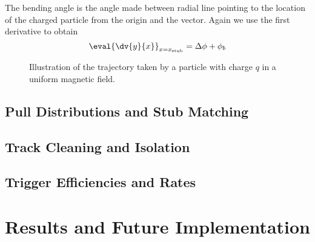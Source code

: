 The bending angle is the angle made between radial line pointing to the location of the charged particle from the origin and the \pt vector. Again we use the first derivative to obtain
\begin{equation}
  \eval{\dv{y}{x}}_{x=x_\mathrm{stub}}=\Delta\phi+\phi_b
\end{equation}

\begin{figure}[htbp]
  \centering
  
  \caption{Illustration of the trajectory taken by a particle with charge $q$ in a uniform magnetic field. }
  \label{fig:arc}
\end{figure}


\subsection{Pull Distributions and Stub Matching}
\label{subsec:pulls}

\subsection{Track Cleaning and Isolation}
\label{subsec:cleaning}

\subsection{Trigger Efficiencies and Rates}
\label{subsec:rates}

\section{Results and Future Implementation}
\label{subsec:TPSResults}

